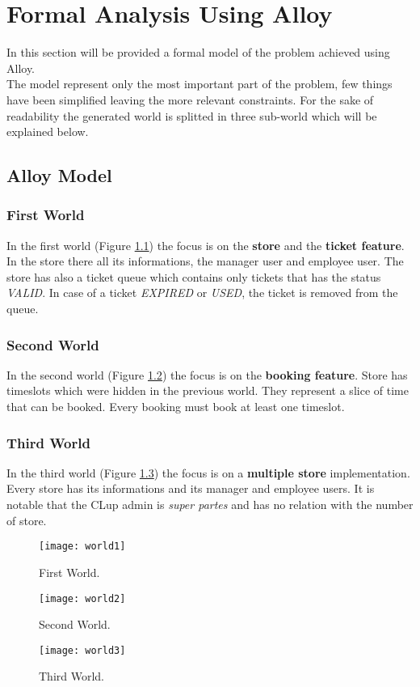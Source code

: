 \chapter{Formal Analysis Using Alloy}
In this section will be provided a formal model of the problem achieved using Alloy. \\
The model represent only the most important part of the problem, few things have been simplified leaving the more relevant constraints.
For the sake of readability the generated world is splitted in three sub-world which will be explained below.

\section{Alloy Model}


\subsection{First World}
In the first world (Figure \ref{fig:world1}) the focus is on the \textbf{store} and the \textbf{ticket feature}. In the store there all its informations,
the manager user and employee user. The store has also a ticket queue which contains only tickets that has the status \textit{VALID}. 
In case of a ticket \textit{EXPIRED} or \textit{USED}, the ticket is removed from the queue.
\subsection{Second World}
In the second world (Figure \ref{fig:world2}) the focus is on the \textbf{booking feature}. Store has timeslots which were hidden in the previous world. They represent a slice of time that can be booked.
Every booking must book at least one timeslot.
\subsection{Third World}
In the third world (Figure \ref{fig:world3}) the focus is on a \textbf{multiple store} implementation. Every store has its informations and its manager and employee users. It is notable that the CLup admin
is \textit{super partes} and has no relation with the number of store.

\begin{figure}[H]
	\centering
	\texttt{[image: world1]}
	\caption{First World.}
	\label{fig:world1}
\end{figure}
\begin{figure}[H]
	\centering
	\texttt{[image: world2]}
	\caption{Second World.}
	\label{fig:world2}
\end{figure}
\begin{figure}[H]
	\centering
	\texttt{[image: world3]}
	\caption{Third World.}
	\label{fig:world3}
\end{figure}
